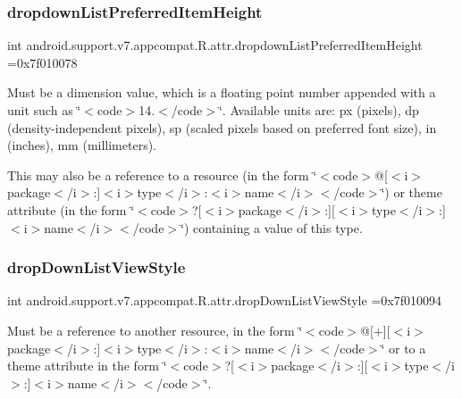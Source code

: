 \subsubsection{\texorpdfstring{dropdown\+List\+Preferred\+Item\+Height}{dropdownListPreferredItemHeight}}
{\footnotesize\ttfamily int android.\+support.\+v7.\+appcompat.\+R.\+attr.\+dropdown\+List\+Preferred\+Item\+Height =0x7f010078\hspace{0.3cm}{\ttfamily [static]}}

Must be a dimension value, which is a floating point number appended with a unit such as \char`\"{}$<$code$>$14.\+5sp$<$/code$>$\char`\"{}. Available units are\+: px (pixels), dp (density-\/independent pixels), sp (scaled pixels based on preferred font size), in (inches), mm (millimeters). 

This may also be a reference to a resource (in the form \char`\"{}$<$code$>$@\mbox{[}$<$i$>$package$<$/i$>$\+:\mbox{]}$<$i$>$type$<$/i$>$\+:$<$i$>$name$<$/i$>$$<$/code$>$\char`\"{}) or theme attribute (in the form \char`\"{}$<$code$>$?\mbox{[}$<$i$>$package$<$/i$>$\+:\mbox{]}\mbox{[}$<$i$>$type$<$/i$>$\+:\mbox{]}$<$i$>$name$<$/i$>$$<$/code$>$\char`\"{}) containing a value of this type. \mbox{\label{classandroid_1_1support_1_1v7_1_1appcompat_1_1R_1_1attr_a983f0eda5b58e2bd8586fe66c18b0ec9}} 
\subsubsection{\texorpdfstring{drop\+Down\+List\+View\+Style}{dropDownListViewStyle}}
{\footnotesize\ttfamily int android.\+support.\+v7.\+appcompat.\+R.\+attr.\+drop\+Down\+List\+View\+Style =0x7f010094\hspace{0.3cm}{\ttfamily [static]}}

Must be a reference to another resource, in the form \char`\"{}$<$code$>$@\mbox{[}+\mbox{]}\mbox{[}$<$i$>$package$<$/i$>$\+:\mbox{]}$<$i$>$type$<$/i$>$\+:$<$i$>$name$<$/i$>$$<$/code$>$\char`\"{} or to a theme attribute in the form \char`\"{}$<$code$>$?\mbox{[}$<$i$>$package$<$/i$>$\+:\mbox{]}\mbox{[}$<$i$>$type$<$/i$>$\+:\mbox{]}$<$i$>$name$<$/i$>$$<$/code$>$\char`\"{}. \mbox{\label{classandroid_1_1support_1_1v7_1_1appcompat_1_1R_1_1attr_a12d7ef83c1530a4fd506091342cbf601}} 
